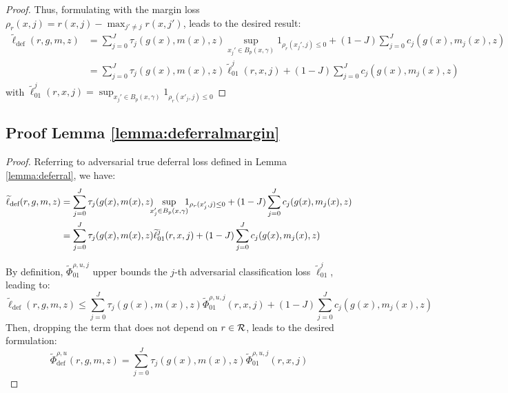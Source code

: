 \begin{appendices}
\begin{proof}
Thus, formulating with the margin loss $\rho_r(x,j) = r(x,j) - \max_{j'\not=j}r(x,j')$, leads to the desired result:
\begin{equation}
\begin{aligned}
    \widetilde{\ell}_{\text{def}}(r, g,m,z) & = \sum_{j=0}^J \tau_j(g(x),m(x),z) \sup_{x_j' \in B_p(x, \gamma)} 1_{\rho_r(x_j', j) \leq 0} + (1-J) \sum_{j=0}^J c_j(g(x),m_j(x),z) \\
    & = \sum_{j=0}^J \tau_j(g(x),m(x),z) \widetilde{\ell}^j_{01}(r,x,j) + (1-J) \sum_{j=0}^J c_j(g(x),m_j(x),z)
\end{aligned}
\end{equation}
with $\widetilde{\ell}^j_{01}(r,x,j) = \sup_{x_j'\in B_p(x,\gamma)}1_{\rho_r(x'_j,j)\leq0}$
\end{proof}

\subsection{Proof Lemma \ref{lemma:deferralmargin}} \label{proof:margindeferral}
\margindeferral*
\begin{proof}
    Referring to adversarial true deferral loss defined in Lemma \ref{lemma:deferral}, we have:
\begin{equation*}
\begin{aligned}
    \widetilde{\ell}_{\text{def}}(r, g,m,z) & = \sum_{j=0}^J \tau_j(g(x),m(x),z) \mspace{-10mu} \sup_{x_j' \in B_p(x, \gamma)} \mspace{-10mu} 1_{\rho_r(x_j', j) \leq 0} + (1-J) \sum_{j=0}^J c_j(g(x),m_j(x),z) \\
    & = \sum_{j=0}^J \tau_j(g(x),m(x),z) \widetilde{\ell}^j_{01}(r,x,j) + (1-J) \sum_{j=0}^J c_j(g(x),m_j(x),z)
\end{aligned}
\end{equation*}

By definition, \(\widetilde{\Phi}^{\rho,u,j}_{01}\) upper bounds the $j$-th adversarial classification loss \(\widetilde{\ell}_{01}^j\), leading to:
\begin{equation}
    \widetilde{\ell}_{\text{def}}(r, g,m,z) \leq \sum_{j=0}^J \tau_j(g(x),m(x),z) \widetilde{\Phi}^{\rho,u,j}_{01}(r, x, j) + (1-J) \sum_{j=0}^J c_j(g(x),m_j(x),z)
\end{equation}
Then, dropping the term that does not depend on $r\in\mathcal{R}$, leads to the desired formulation:
\begin{equation}
    \widetilde{\Phi}^{\rho, u}_{\text{def}}(r, g,m,z) = \sum_{j=0}^J \tau_j(g(x),m(x),z) \widetilde{\Phi}^{\rho,u,j}_{01}(r, x, j)
\end{equation}


\end{proof}
\end{appendices}
